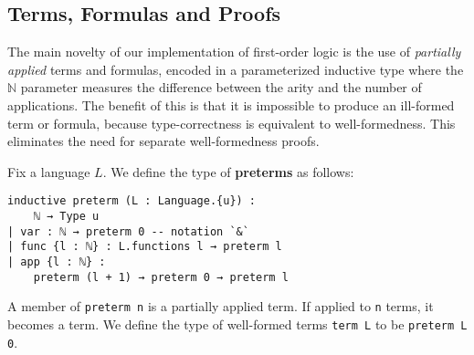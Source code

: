 \documentclass[sigplan,10pt,review, anonymous]{acmart}
\newcommand{\lil}{\lstinline}
\newcommand{\N}{\mathbb{N}}
\theoremstyle{definition}
\begin{document}
\subsection{Terms, Formulas and Proofs}
\label{subsect:fol:terms}
The main novelty of our implementation of first-order logic is the use of \emph{partially applied} terms and formulas, encoded in a parameterized inductive type where the $\N$ parameter measures the difference between the arity and the number of applications.
The benefit of this is that it is impossible to produce an ill-formed term or formula, because type-correctness is equivalent to well-formedness.
This eliminates the need for separate well-formedness proofs.

Fix a language $L$. We define the type of \textbf{preterms} as follows:
\begin{lstlisting}
inductive preterm (L : Language.{u}) :
    ℕ → Type u
| var : ℕ → preterm 0 -- notation `&`
| func {l : ℕ} : L.functions l → preterm l
| app {l : ℕ} :
    preterm (l + 1) → preterm 0 → preterm l
\end{lstlisting}
A member of \lil{preterm n} is a partially applied term.
If applied to \lil{n} terms, it becomes a term.
We define the type of well-formed terms \lil{term L} to be \lil{preterm L 0}.

\end{document}
